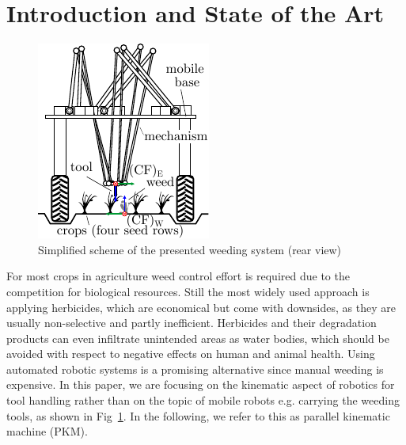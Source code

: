 \documentclass[runningheads,hidelinks]{llncs}
\begin{document}
\section{Introduction and State of the Art}
\begin{figure}
    \centering
	\vspace{-8mm}
	\includegraphics[width=1.0\linewidth]{weeding_system.pdf}
	\caption{Simplified scheme of the presented weeding system (rear view)}
	\label{fig:application_scenario}
	\vspace{-7mm}
\end{figure}
For most crops in agriculture weed control effort is required due to the competition for biological resources. 
Still the most widely used approach is applying herbicides, which are economical but come with downsides, as they are usually non-selective and partly inefficient. 
Herbicides and their degradation products can even infiltrate unintended areas as water bodies, which should be avoided with respect to negative effects on human and animal health. 
Using automated robotic systems is a promising alternative since manual weeding is expensive. 
In this paper, we are focusing on the kinematic aspect of robotics for tool handling rather than on the topic of mobile robots e.g. carrying the weeding tools, as shown in Fig~\ref{fig:application_scenario}. 
In the following, we refer to this as parallel kinematic machine (PKM).
\end{document}
